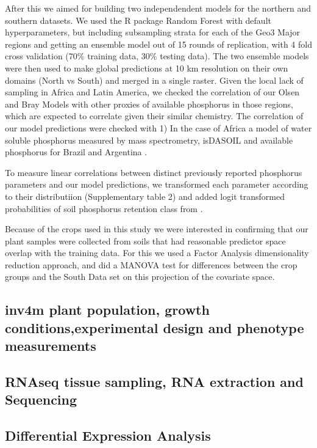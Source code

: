 After this we aimed for building two independendent models for the northern and southern datasets. We used the R package Random Forest \citep{liaw2002}with default hyperparameters, but including subsampling strata  for each of the Geo3 Major regions and getting an ensemble model out of 15 rounds of replication, with 4 fold cross validation (70\% training data, 30\% testing data). 
The two ensemble models were then used to make global predictions at 10 km resolution on their own domains (North vs South) and merged in a single raster.
Given the local lack of sampling in Africa and Latin America, we checked the correlation of our Olsen and Bray Models with other proxies of available phosphorus in those regions, which are expected to correlate given their similar chemistry. The correlation of  our model predictions were checked with 1) In the case of Africa a model of water soluble phosphorus measured by mass spectrometry, isDASOIL \citep{miller2021b,hengl2017a} and available phosphorus for Brazil \citep{Samuel-RosaEtAl2018a} and Argentina \citep{cordoba2021}. 

To measure linear correlations between distinct previously reported phosphorus parameters and our model predictions, we transformed  each parameter according to their distributiion (Supplementary table 2)  and  added logit transformed probabilities of  soil phosphorus retention class from \citep{batjes2011}.

Because of the crops used in this study we were interested in confirming that our plant samples were collected from soils that had reasonable predictor space overlap with the training data. For this we used a Factor Analysis dimensionality reduction approach, and did a MANOVA test for differences between the crop groups and the South Data set on this projection of the covariate space.

\subsection*{inv4m plant population, growth conditions,experimental design and phenotype measurements}

\subsection*{RNAseq tissue sampling, RNA extraction and Sequencing}

\subsection*{Differential Expression Analysis}


